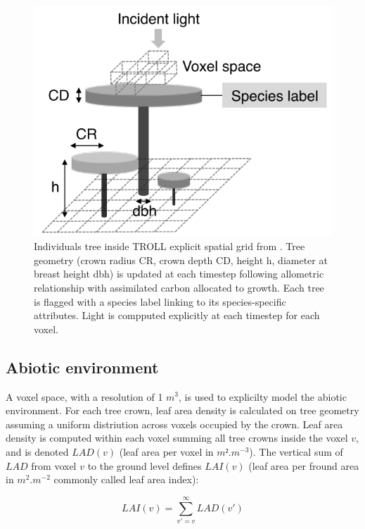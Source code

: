\documentclass[]{article}
\theoremstyle{definition}
\theoremstyle{definition}
\theoremstyle{remark}
\begin{document}
\begin{figure}[htbp]
\centering
\includegraphics{images/TROLLtree.png}
\caption{\label{fig:TROLLtree}Individuals tree inside TROLL explicit spatial
grid from \citet{Li}. Tree geometry (crown radius CR, crown depth CD,
height h, diameter at breast height dbh) is updated at each timestep
following allometric relationship with assimilated carbon allocated to
growth. Each tree is flagged with a species label linking to its
species-specific attributes. Light is compputed explicitly at each
timestep for each voxel.}
\end{figure}

\subsection{Abiotic environment}\label{abiotic-environment}

A voxel space, with a resolution of 1 \(m^3\), is used to explicilty
model the abiotic environment. For each tree crown, leaf area density is
calculated on tree geometry assuming a uniform distriution across voxels
occupied by the crown. Leaf area density is computed within each voxel
summing all tree crowns inside the voxel \(v\), and is denoted
\(LAD(v)\) (leaf area per voxel in \(m².m^{-3}\)). The vertical sum of
\(LAD\) from voxel \(v\) to the ground level defines \(LAI(v)\) (leaf
area per fround area in \(m^2.m^{-2}\) commonly called leaf area index):

\begin{equation}
  LAI(v) = \sum _{v'=v} ^\infty LAD(v') 
  \label{eq:LAI}
\end{equation}
\end{document}
